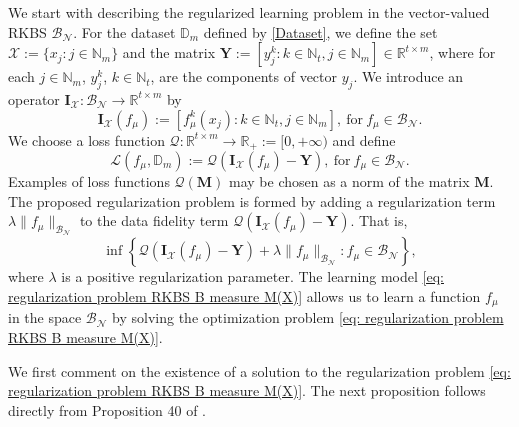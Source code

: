 \documentclass[11pt]{article}
\begin{document}
We start with describing the regularized learning problem in the vector-valued RKBS $\mathcal{B}_{\mathcal{N}}$.  For the dataset $\mathbb{D}_m$ defined by \eqref{Dataset}, we define the set $\mathcal{X}:=\{x_j:j\in\mathbb{N}_m\}$ and the matrix $\mathbf{Y}:=[y_j^k:k\in\mathbb{N}_t,j\in\mathbb{N}_{m}]\in\mathbb{R}^{t\times m}$, where for each $j\in\mathbb{N}_m$, $y_j^k$, $k\in\mathbb{N}_t$, are the components of vector $y_j$. 
We introduce an operator $\mathbf{I}_\mathcal{X}:{\mathcal{B}_{\mathcal{N}}} \rightarrow \mathbb{R}^{t\times m}$ by 
\begin{equation}\label{L YES DC}
\mathbf{I}_\mathcal{X}(f_\mu):=\left[f^k_{\mu}(x_j): k\in\mathbb{N}_t,j\in\mathbb{N}_{m}\right],\ \mbox{for}\ f_\mu\in\mathcal{B}_{\mathcal{N}}.
\end{equation} 
%
We choose a loss function $\mathcal{Q}: \mathbb{R}^{t\times m} \rightarrow \mathbb{R}_{+}:=[0,+\infty)$ and define 
\begin{equation}\label{loss:An example}
    \mathcal{L}(f_{\mu},\mathbb{D}_m):=\mathcal{Q}(\mathbf{I}_{\mathcal{X}}(f_\mu)-\mathbf{Y}),\ \mbox{for}\ f_{\mu}\in\mathcal{B}_{\mathcal{N}}.
\end{equation}
Examples of loss functions $\mathcal{Q}({\mathbf{M}})$ may be chosen as a norm of the matrix $\mathbf{M}$.
The proposed regularization problem is formed by adding a regularization
term $\lambda\| f_\mu\|_{{\mathcal{B}_{\mathcal{N}}}}$ to the data fidelity term $\mathcal{Q}(\mathbf{I}_{\mathcal{X}}(f_{\mu})-\mathbf{Y})$. That is, %
%
\begin{equation}\label{eq: regularization problem RKBS B measure M(X)}
    \inf \left\{\mathcal{Q}(\mathbf{I}_{\mathcal{X}}(f_\mu)-\mathbf{Y})+\lambda\| f_\mu\|_{{\mathcal{B}_{\mathcal{N}}}}:  f_\mu\in {\mathcal{B}_{\mathcal{N}}}\right\},
\end{equation}
where $\lambda$ is a positive regularization parameter. The learning model \eqref{eq: regularization problem RKBS B measure M(X)} allows us to learn a function $f_\mu$ in the space $\mathcal{B}_\mathcal{N}$ by solving the optimization problem  \eqref{eq: regularization problem RKBS B measure M(X)}.
%
%


We first comment on the existence of a solution to the regularization problem \eqref{eq: regularization problem RKBS B measure M(X)}. The next proposition follows directly from Proposition 40 of  \cite{wang2021representer}.

%
%
\end{document}
